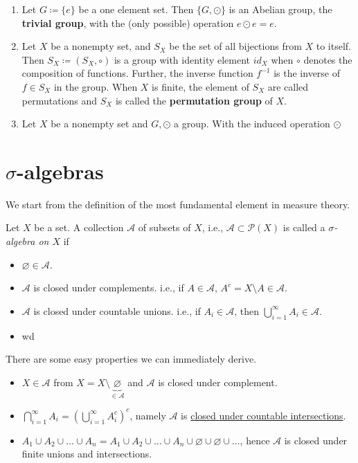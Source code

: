 \begin{eg}
	\begin{enumerate}[label=(\alph*)]
		\item Let \(G \coloneqq \{e\}\) be a one element set. Then \( \{G, \odot\} \) is an Abelian group, the 
		\textbf{trivial group}, with the (only possible) operation \(e \odot e = e\). 
		\item Let \(X\) be a nonempty set, and \(S_X\) be the set of all bijections from \(X\) to itself. 
		Then \(S_X \coloneqq \left(S_X, \circ \right)\) is a group with identity element \(id_X\) when \(\circ\)
		denotes the composition of functions. Further, the inverse function \(f^{-1}\) is the inverse of \(f \in S_X\)
		in the group. When \(X\) is finite, the element of \(S_X\) are called permutations and \(S_X\) is called 
		the \textbf{permutation group} of \(X\).
		\item Let \(X\) be a nonempty set and \(G, \odot \) a group. With the induced operation \(\odot\)
	\end{enumerate}
\end{eg}


\section{\(\sigma\)-algebras}
We start from the definition of the most fundamental element in measure theory.
\begin{definition}\label{def:sigma-algebra}
	Let \(X\) be a set. A collection \(\mathcal{A} \) of subsets of \(X\), i.e., \(\mathcal{A}\subset \mathcal{P} (X) \) is called a \emph{\(\sigma\)-algebra on \(X\)} if
	\begin{itemize}
		\item \(\varnothing \in \mathcal{A} \).
		\item \(\mathcal{A} \) is closed under complements. i.e., if \(A\in \mathcal{A} \), \(A^c = X\setminus A\in \mathcal{A} \).
		\item \(\mathcal{A} \) is closed under countable unions. i.e., if \(A_i\in \mathcal{A} \), then \(\bigcup\limits_{i=1}^{\infty} A_{i}\in \mathcal{A} \).
		\item wd
	\end{itemize}
\end{definition}

\begin{remark}
	There are some easy properties we can immediately derive.
	\begin{itemize}
		\item \(X\in \mathcal{A} \) from \(X = X\setminus \underbrace{\varnothing}_{\in \mathcal{A}} \) and \(\mathcal{A}\) is closed under complement.
		\item \(\bigcap\limits_{i=1}^{\infty} A_{i} = \left(\bigcup\limits_{i=1}^{\infty} A_{i}^{c} \right)^c\), namely \(\mathcal{A} \) is \underline{closed under countable intersections}.
		\item \(A_1\cup A_2 \cup \ldots \cup A_n = A_1\cup A_2 \cup \ldots \cup A_n \cup \varnothing \cup \varnothing \cup\ldots\), hence \(\mathcal{A} \) is closed under finite unions and intersections.
	\end{itemize}
\end{remark}

